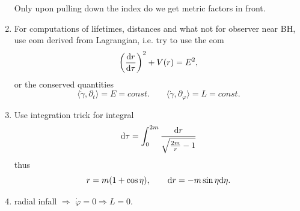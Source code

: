 \begin{enumerate}
\begin{equation}
\end{equation}
Only upon pulling down the index do we get metric factors in front.
\item For computations of lifetimes, distances and what not for observer near BH, use eom derived from Lagrangian, i.e. try to use the eom
\begin{equation}
	\left(\frac{\mathrm{d} r}{\mathrm{d} \tau}\right)^2 + V(r) = E^2,
\end{equation}
or the conserved quantities 
\begin{equation}
	\langle \dot{\gamma} , \partial_t\rangle = E= const. \qquad \langle \dot{\gamma},\partial_\varphi\rangle = L =const.
	\end{equation}

\item Use integration trick for integral
\begin{equation}
	\mathrm{d} \tau = \int_0^{2m} \frac{\mathrm{d} r}{\sqrt{\frac{2m}{r} -1}}
\end{equation}
thus
\begin{equation}
	r = m(1+\cos \eta),\qquad \mathrm{d} r = - m \sin \eta \mathrm{d} \eta.
\end{equation}
\item radial infall $\Rightarrow$ $\dot{\varphi}=0 \Rightarrow L=0$.
\end{enumerate}
